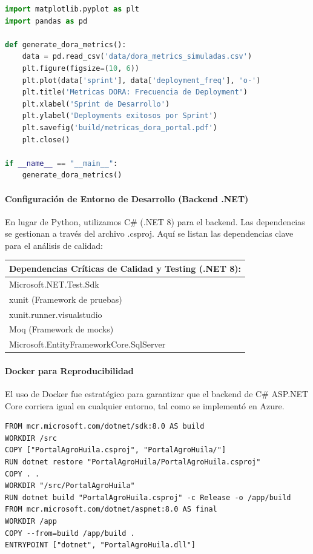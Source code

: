 \begin{lstlisting}[language=Python, caption={Script de generacion de metricas DORA}]
import matplotlib.pyplot as plt
import pandas as pd

def generate_dora_metrics():
    data = pd.read_csv('data/dora_metrics_simuladas.csv')
    plt.figure(figsize=(10, 6))
    plt.plot(data['sprint'], data['deployment_freq'], 'o-')
    plt.title('Metricas DORA: Frecuencia de Deployment')
    plt.xlabel('Sprint de Desarrollo')
    plt.ylabel('Deployments exitosos por Sprint')
    plt.savefig('build/metricas_dora_portal.pdf')
    plt.close()

if __name__ == "__main__":
    generate_dora_metrics()
\end{lstlisting}

\paragraph{Configuración de Entorno de Desarrollo (Backend .NET)}

En lugar de Python, utilizamos C\# (.NET 8) para el backend. Las dependencias se gestionan a través del archivo .csproj. Aquí se listan las dependencias clave para el análisis de calidad:

\begin{table}[htbp]
\centering
\begin{tabular}{|p{8cm}|}
\hline
\textbf{Dependencias Críticas de Calidad y Testing (.NET 8):} \\
\hline
Microsoft.NET.Test.Sdk \\
xunit (Framework de pruebas) \\
xunit.runner.visualstudio \\
Moq (Framework de mocks) \\
Microsoft.EntityFrameworkCore.SqlServer \\
\hline
\end{tabular}
\end{table}

\paragraph{Docker para Reproducibilidad}

El uso de Docker fue estratégico para garantizar que el backend de C\# ASP.NET Core corriera igual en cualquier entorno, tal como se implementó en Azure.

\begin{lstlisting}[caption={Dockerfile para el backend}]
FROM mcr.microsoft.com/dotnet/sdk:8.0 AS build
WORKDIR /src
COPY ["PortalAgroHuila.csproj", "PortalAgroHuila/"]
RUN dotnet restore "PortalAgroHuila/PortalAgroHuila.csproj"
COPY . .
WORKDIR "/src/PortalAgroHuila"
RUN dotnet build "PortalAgroHuila.csproj" -c Release -o /app/build
FROM mcr.microsoft.com/dotnet/aspnet:8.0 AS final
WORKDIR /app
COPY --from=build /app/build .
ENTRYPOINT ["dotnet", "PortalAgroHuila.dll"]
\end{lstlisting}

